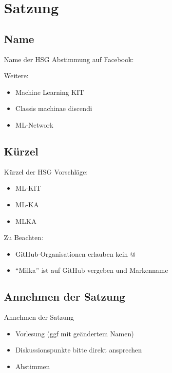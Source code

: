 \section{Satzung}

\subsection{Name}

\begin{frame}{Name der HSG}
    Abstimmung auf Facebook:
    \begin{bchart}[step=2,max=23]
            \smallskip
            \medskip
            \medskip
    \end{bchart}

    Weitere:
    \begin{itemize}
        \item Machine Learning KIT
        \item Classis machinae discendi
        \item ML-Network
    \end{itemize}
\end{frame}

\subsection{Kürzel}

\begin{frame}{Kürzel der HSG}
    Vorschläge:
    \begin{itemize}
        \item ML-KIT
        \item ML-KA
        \item MLKA
    \end{itemize}

    Zu Beachten:
    \begin{itemize}
        \item GitHub-Organisationen erlauben kein @
        \item \enquote{Milka} ist auf GitHub vergeben und Markenname
    \end{itemize}
\end{frame}

\subsection{Annehmen der Satzung}
\begin{frame}{Annehmen der Satzung}
    \begin{itemize}
        \item Vorlesung (ggf mit geändertem Namen)
        \item Diskussionspunkte bitte direkt ansprechen
        \item Abstimmen
    \end{itemize}
\end{frame}

